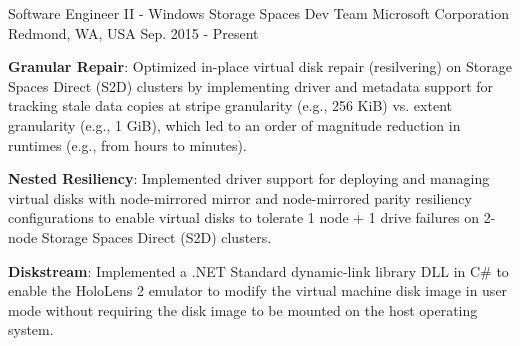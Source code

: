 

\begin{cventries}

  \cventry
    {Software Engineer II - Windows Storage Spaces Dev Team} %
    {Microsoft Corporation} %
    {Redmond, WA, USA} %
    {Sep. 2015 - Present} %
    {
      \begin{cvitems} %
        \item {
          \textbf{Granular Repair}: Optimized in-place virtual disk repair (resilvering) on Storage
          Spaces Direct (S2D) clusters by implementing driver and metadata support for tracking
          stale data copies at stripe granularity (e.g., 256 KiB) vs. extent granularity (e.g.,
          1 GiB), which led to an order of magnitude reduction in runtimes (e.g., from hours to
          minutes).
        }
        \item {
          \textbf{Nested Resiliency}: Implemented driver support for deploying and managing virtual
          disks with node-mirrored mirror and node-mirrored parity resiliency configurations to
          enable virtual disks to tolerate 1 node + 1 drive failures on 2-node Storage Spaces
          Direct (S2D) clusters.
        }
        \item {
          \textbf{Diskstream}: Implemented a .NET Standard dynamic-link library DLL in C\# to
          enable the HoloLens 2 emulator to modify the virtual machine disk image in user mode
          without requiring the disk image to be mounted on the host operating system.
        }
      \end{cvitems}
    }


\end{cventries}
